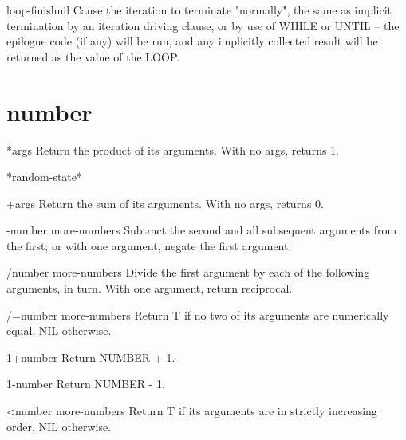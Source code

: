 \begin{local-macro}{loop-finish}{nil}{}
  Cause the iteration to terminate "normally", the same as implicit
termination by an iteration driving clause, or by use of WHILE or
UNTIL -- the epilogue code (if any) will be run, and any implicitly
collected result will be returned as the value of the LOOP.
\end{local-macro}

\section{number}

\begin{function}{*}{\rest args}{}
  Return the product of its arguments. With no args, returns 1.
\end{function}

\begin{variable}{*random-state*}{}{}
  
\end{variable}

\begin{function}{+}{\rest args}{}
  Return the sum of its arguments. With no args, returns 0.
\end{function}

\begin{function}{-}{number \rest more-numbers}{}
  Subtract the second and all subsequent arguments from the first;
  or with one argument, negate the first argument.
\end{function}

\begin{function}{/}{number \rest more-numbers}{}
  Divide the first argument by each of the following arguments, in turn.
  With one argument, return reciprocal.
\end{function}

\begin{function}{/=}{number \rest more-numbers}{}
  Return T if no two of its arguments are numerically equal, NIL otherwise.
\end{function}

\begin{function}{1+}{number}{}
  Return NUMBER + 1.
\end{function}

\begin{function}{1-}{number}{}
  Return NUMBER - 1.
\end{function}

\begin{function}{<}{number \rest more-numbers}{}
  Return T if its arguments are in strictly increasing order, NIL otherwise.
\end{function}

